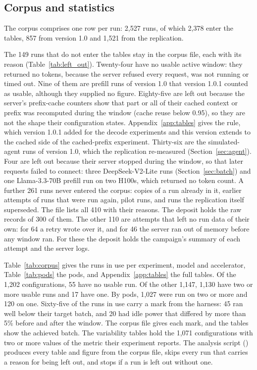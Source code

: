 \documentclass[11pt]{article}
\begin{document}
\subsection{Corpus and statistics}\label{sec:stats}

The corpus comprises one row per run: 2,527 runs, of which 2,378 enter the tables, 857 from version 1.0 and 1,521 from the replication.

The 149 runs that do not enter the tables stay in the corpus file, each with its reason (Table~\ref{tab:left_out}). Twenty-four have no usable active window: they returned no tokens, because the server refused every request, was not running or timed out. Nine of them are prefill runs of version 1.0 that version 1.0.1 counted as usable, although they supplied no figure. Eighty-five are left out because the server's prefix-cache counters show that part or all of their cached context or prefix was recomputed during the window (cache reuse below 0.95), so they are not the shape their configuration states. Appendix~\ref{app:tables} gives the rule, which version 1.0.1 added for the decode experiments and this version extends to the cached side of the cached-prefix experiment. Thirty-six are the simulated-agent runs of version 1.0, which the replication re-measured (Section~\ref{sec:agent}). Four are left out because their server stopped during the window, so that later requests failed to connect: three DeepSeek-V2-Lite runs (Section~\ref{sec:batch}) and one Llama-3.3-70B prefill run on two H100s, which returned no token count. A further 261 runs never entered the corpus: copies of a run already in it, earlier attempts of runs that were run again, pilot runs, and runs the replication itself superseded. The file  lists all 410 with their reasons. The deposit holds the raw records of 300 of them. The other 110 are attempts that left no run data of their own: for 64 a retry wrote over it, and for 46 the server ran out of memory before any window ran. For these the deposit holds the campaign's summary of each attempt and the server logs.

Table~\ref{tab:corpus} gives the runs in use per experiment, model and accelerator, Table~\ref{tab:pods} the pods, and Appendix~\ref{app:tables} the full tables. Of the 1,202 configurations, 55 have no usable run. Of the other 1,147, 1,130 have two or more usable runs and 17 have one. By pods, 1,027 were run on two or more and 120 on one. Sixty-five of the runs in use carry a mark from the harness: 45 ran well below their target batch, and 20 had idle power that differed by more than 5\% before and after the window. The corpus file gives each mark, and the tables show the achieved batch. The variability tables hold the 1,071 configurations with two or more values of the metric their experiment reports. The analysis script () produces every table and figure from the corpus file, skips every run that carries a reason for being left out, and stops if a run is left out without one.
\end{document}

